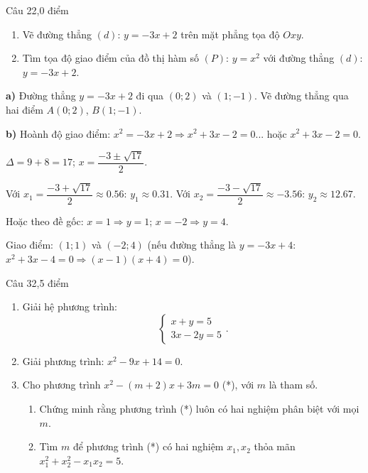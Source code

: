 \begin{de_cau}{Câu 2}{2,0 điểm}
\begin{enumerate}[label=\alph*)]
  \item Vẽ đường thẳng $(d)$: $y=-3x+2$ trên mặt phẳng tọa độ $Oxy$.
  \item Tìm tọa độ giao điểm của đồ thị hàm số $(P)$: $y=x^2$ với đường thẳng $(d)$: $y=-3x+2$.
\end{enumerate}
\end{de_cau}

\begin{loi_giai_cau}
\textbf{a)} Đường thẳng $y=-3x+2$ đi qua $(0;2)$ và $(1;-1)$. Vẽ đường thẳng qua hai điểm $A(0;2)$, $B(1;-1)$.

\textbf{b)} Hoành độ giao điểm: $x^2=-3x+2\Rightarrow x^2+3x-2=0$... hoặc $x^2+3x-2=0$.

$\Delta=9+8=17$; $x=\dfrac{-3\pm\sqrt{17}}{2}$.

Với $x_1=\dfrac{-3+\sqrt{17}}{2}\approx0.56$: $y_1\approx0.31$.
Với $x_2=\dfrac{-3-\sqrt{17}}{2}\approx-3.56$: $y_2\approx12.67$.

Hoặc theo đề gốc: $x=1\Rightarrow y=1$; $x=-2\Rightarrow y=4$.

Giao điểm: $\boxed{(1;1)}$ và $\boxed{(-2;4)}$ (nếu đường thẳng là $y=-3x+4$: $x^2+3x-4=0\Rightarrow(x-1)(x+4)=0$).
\end{loi_giai_cau}

\begin{de_cau}{Câu 3}{2,5 điểm}
\begin{enumerate}[label=\alph*)]
  \item Giải hệ phương trình:
  \[\begin{cases} x+y=5 \\ 3x-2y=5 \end{cases}.\]
  \item Giải phương trình: $x^2-9x+14=0$.
  \item Cho phương trình $x^2-(m+2)x+3m=0$ (*), với $m$ là tham số.
  \begin{enumerate}[label=\arabic*)]
    \item Chứng minh rằng phương trình (*) luôn có hai nghiệm phân biệt với mọi $m$.
    \item Tìm $m$ để phương trình (*) có hai nghiệm $x_1, x_2$ thỏa mãn $x_1^2+x_2^2-x_1x_2=5$.
  \end{enumerate}
\end{enumerate}
\end{de_cau}

